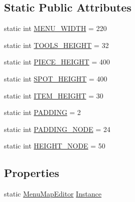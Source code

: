 \subsection*{Static Public Attributes}
\begin{DoxyCompactItemize}
\item 
static int \hyperlink{classgearit_1_1src_1_1editor_1_1map_1_1_menu_map_editor_ad338b47b1f80997c74f2c573f96c8993}{M\+E\+N\+U\+\_\+\+W\+I\+D\+T\+H} = 220
\item 
static int \hyperlink{classgearit_1_1src_1_1editor_1_1map_1_1_menu_map_editor_a53acab0674192ebd5570bd4497e1d89a}{T\+O\+O\+L\+S\+\_\+\+H\+E\+I\+G\+H\+T} = 32
\item 
static int \hyperlink{classgearit_1_1src_1_1editor_1_1map_1_1_menu_map_editor_a3e599049069e4bcd480d72a96b47b6b1}{P\+I\+E\+C\+E\+\_\+\+H\+E\+I\+G\+H\+T} = 400
\item 
static int \hyperlink{classgearit_1_1src_1_1editor_1_1map_1_1_menu_map_editor_ad66194c3d7b8e390ffbae19fbfcfcb45}{S\+P\+O\+T\+\_\+\+H\+E\+I\+G\+H\+T} = 400
\item 
static int \hyperlink{classgearit_1_1src_1_1editor_1_1map_1_1_menu_map_editor_a5f36ee89e8919243e8bfacece70914da}{I\+T\+E\+M\+\_\+\+H\+E\+I\+G\+H\+T} = 30
\item 
static int \hyperlink{classgearit_1_1src_1_1editor_1_1map_1_1_menu_map_editor_ae3f41b869e948cefc1300b977bd0d432}{P\+A\+D\+D\+I\+N\+G} = 2
\item 
static int \hyperlink{classgearit_1_1src_1_1editor_1_1map_1_1_menu_map_editor_abc2db0c1acd16dbc89aa71e6747b0bda}{P\+A\+D\+D\+I\+N\+G\+\_\+\+N\+O\+D\+E} = 24
\item 
static int \hyperlink{classgearit_1_1src_1_1editor_1_1map_1_1_menu_map_editor_a3963aa03322ad1265b62f1070f0f8d9e}{H\+E\+I\+G\+H\+T\+\_\+\+N\+O\+D\+E} = 50
\end{DoxyCompactItemize}
\subsection*{Properties}
\begin{DoxyCompactItemize}
\item 
static \hyperlink{classgearit_1_1src_1_1editor_1_1map_1_1_menu_map_editor}{Menu\+Map\+Editor} \hyperlink{classgearit_1_1src_1_1editor_1_1map_1_1_menu_map_editor_a0ce4fec02393506769a8bd1cc2182395}{Instance}
\end{DoxyCompactItemize}


